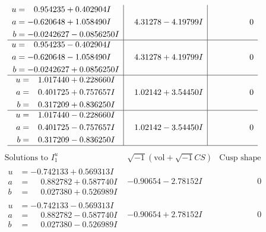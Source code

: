 \documentclass[1p]{elsarticle_modified}
\theoremstyle{definition}
\newcommand{\I}{\sqrt{-1}}
\begin{document}
$$\begin{array}{c|c|c}
\begin{aligned}
u &= \phantom{-}0.954235 + 0.402904 I \\
a &= -0.620648 + 1.058490 I \\
b &= -0.0242627 - 0.0856250 I\end{aligned}
 & \phantom{-}4.31278 - 4.19799 I & \phantom{-0.000000 } 0 \\ \hline\begin{aligned}
u &= \phantom{-}0.954235 - 0.402904 I \\
a &= -0.620648 - 1.058490 I \\
b &= -0.0242627 + 0.0856250 I\end{aligned}
 & \phantom{-}4.31278 + 4.19799 I & \phantom{-0.000000 } 0 \\ \hline\begin{aligned}
u &= \phantom{-}1.017440 + 0.228660 I \\
a &= \phantom{-}0.401725 + 0.757657 I \\
b &= \phantom{-}0.317209 + 0.836250 I\end{aligned}
 & \phantom{-}1.02142 + 3.54450 I & \phantom{-0.000000 } 0 \\ \hline\begin{aligned}
u &= \phantom{-}1.017440 - 0.228660 I \\
a &= \phantom{-}0.401725 - 0.757657 I \\
b &= \phantom{-}0.317209 - 0.836250 I\end{aligned}
 & \phantom{-}1.02142 - 3.54450 I & \phantom{-0.000000 } 0\\
 \hline 
 \end{array}$$\newpage$$\begin{array}{c|c|c}  
\text{Solutions to }I^u_{1}& \I (\text{vol} + \sqrt{-1}CS) & \text{Cusp shape}\\
 \hline 
\begin{aligned}
u &= -0.742133 + 0.569313 I \\
a &= \phantom{-}0.882782 + 0.587740 I \\
b &= \phantom{-}0.027380 + 0.526989 I\end{aligned}
 & -0.90654 - 2.78152 I & \phantom{-0.000000 } 0 \\ \hline\begin{aligned}
u &= -0.742133 - 0.569313 I \\
a &= \phantom{-}0.882782 - 0.587740 I \\
b &= \phantom{-}0.027380 - 0.526989 I\end{aligned}
 & -0.90654 + 2.78152 I & \phantom{-0.000000 } 0 \\ \hline\begin{aligned}

\end{aligned}
\end{array}$$
\end{document}
